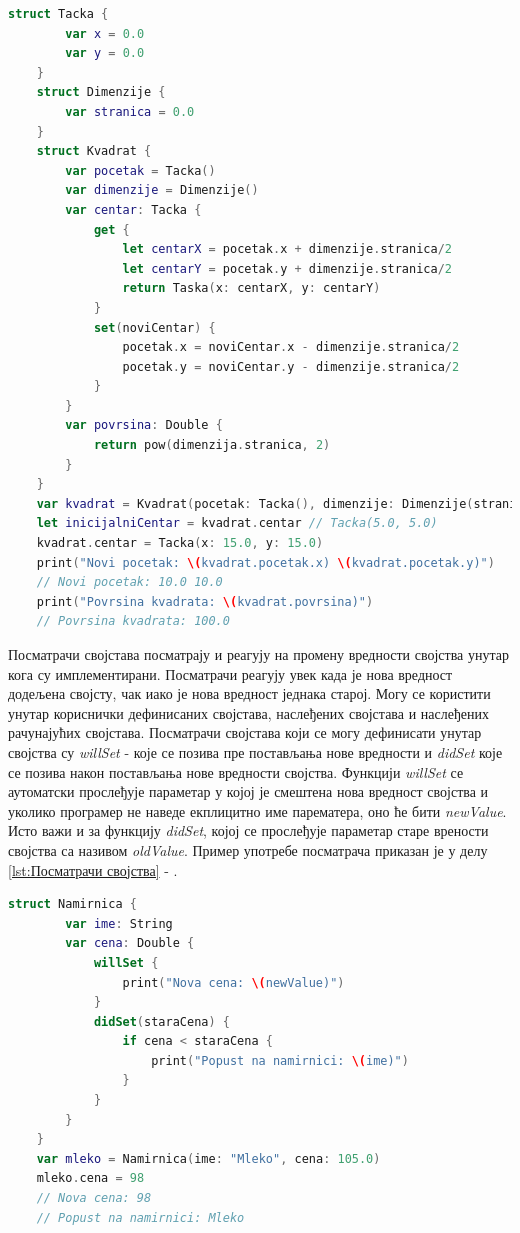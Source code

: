 \documentclass[12pt,oneside]{memoir}
\begin{document}
\begin{lstlisting}[caption=\textit{{Рачунајућа својства}}, label={lst:Рачунајућа својства}, language=Swift, frame=single]
    struct Tacka {
        var x = 0.0
        var y = 0.0
    }
    struct Dimenzije {
        var stranica = 0.0
    }
    struct Kvadrat {
        var pocetak = Tacka()
        var dimenzije = Dimenzije()
        var centar: Tacka {
            get {
                let centarX = pocetak.x + dimenzije.stranica/2
                let centarY = pocetak.y + dimenzije.stranica/2
                return Taska(x: centarX, y: centarY)
            }
            set(noviCentar) {
                pocetak.x = noviCentar.x - dimenzije.stranica/2
                pocetak.y = noviCentar.y - dimenzije.stranica/2
            }
        }
        var povrsina: Double {
            return pow(dimenzija.stranica, 2)
        }
    }
    var kvadrat = Kvadrat(pocetak: Tacka(), dimenzije: Dimenzije(stranica: 10.0))
    let inicijalniCentar = kvadrat.centar // Tacka(5.0, 5.0)
    kvadrat.centar = Tacka(x: 15.0, y: 15.0)
    print("Novi pocetak: \(kvadrat.pocetak.x) \(kvadrat.pocetak.y)")
    // Novi pocetak: 10.0 10.0
    print("Povrsina kvadrata: \(kvadrat.povrsina)")
    // Povrsina kvadrata: 100.0
\end{lstlisting}

\indent Посматрачи својстава посматрају и реагују на промену вредности својства унутар кога су имплементирани. Посматрачи реагују увек када је нова вредност додељена својсту, чак иако је нова вредност једнака старој. Могу се користити унутар кориснички дефинисаних својстава, наслеђених својстава и наслеђених рачунајућих својстава. Посматрачи својстава који се могу дефинисати унутар својства су \textit{willSet} - које се позива пре постављања нове вредности и \textit{didSet} које се позива након постављања нове вредности својства. Функцији \textit{willSet} се аутоматски прослеђује параметар у којој је смештена нова вредност својства и уколико програмер не наведе екплицитно име парематера, оно ће бити \textit{newValue}. Исто важи и за функцију \textit{didSet}, којој се прослеђује параметар старе врености својства са називом \textit{oldValue}. Пример употребе посматрача приказан је у делу \ref{lst:Посматрачи својства} - .

\begin{lstlisting}[caption=\textit{{Посматрачи својства}}, label={lst:Посматрачи својства}, language=Swift, frame=single]
    struct Namirnica {
        var ime: String
        var cena: Double {
            willSet {
                print("Nova cena: \(newValue)")
            }
            didSet(staraCena) {
                if cena < staraCena {
                    print("Popust na namirnici: \(ime)")
                }
            }
        }
    }
    var mleko = Namirnica(ime: "Mleko", cena: 105.0)
    mleko.cena = 98
    // Nova cena: 98
    // Popust na namirnici: Mleko
\end{lstlisting}
\end{document}
